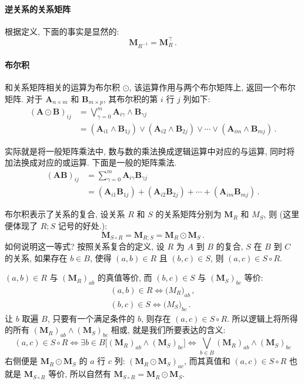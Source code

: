 \documentclass[UTF8]{ctexart}
\theoremstyle{mystyle}
\theoremstyle{myremark}
\theoremstyle{plain}
\newcommand{\ve}[1]{\boldsymbol{\mathbf{#1}}}
\begin{document}
\paragraph{逆关系的关系矩阵}
根据定义, 下面的事实是显然的:
\[ 
    \ve M_{R^{-1}} = \ve M_R^\top \,.
\]

\paragraph{布尔积}
和关系矩阵相关的运算为布尔积 $ \odot $, 该运算作用与两个布尔矩阵上, 返回一个布尔矩阵. 对于 $ \ve A_{n \times m} $ 和 $ \ve B_{m \times p} $, 其布尔积的第 $ i $ 行 $ j $ 列如下:
\begin{align*}
    (\ve A \odot \ve B)_{ij} &= \bigvee_{\gamma = 0}^{m} \ve A_{i \gamma} \land \ve B_{\gamma j} \\
    &= (\ve A_{i1} \land \ve B_{1j}) \lor (\ve A_{i2} \land \ve B_{2j}) \lor \cdots \lor (\ve A_{im} \land \ve B_{mj}) \,.
\end{align*}

实际就是将一般矩阵乘法中, 数与数的乘法换成逻辑运算中对应的与运算, 同时将加法换成对应的或运算. 下面是一般的矩阵乘法.
\begin{align*}
    (\ve A \ve B)_{ij} &= \sum_{\gamma = 0}^{m} \ve A_{i \gamma} \ve B_{\gamma j} \\
    &= (\ve A_{i1} \ve B_{1j}) + (\ve A_{i2} \ve B_{2j}) + \cdots + (\ve A_{im} \ve B_{mj}) \,.
\end{align*}

布尔积表示了关系的复合, 设关系 $ R $ 和 $ S $ 的关系矩阵分别为 $ \ve M_R $ 和 $ M_S $, 则 (这里便体现了 $ R;S $ 记号的好处.):
\[ 
    \ve M_{S \circ R} = \ve M_{R;S} = \ve M_R \odot \ve M_S \,.
\]
如何说明这一等式? 按照关系复合的定义, 设 $ R $ 为 $ A $ 到 $ B $ 的复合, $ S $ 在 $ B $ 到 $ C $ 的关系, 如果存在 $ b \in B $, 使得 $ (a, b) \in R $ 且 $ (b, c) \in S $, 则 $ (a, c) \in S \circ R $.

$ (a, b) \in R $ 与 $ (\ve M_R)_{ab} $ 的真值等价, 而 $ (b, c) \in S $ 与 $ (\ve M_S)_{bc} $ 等价:
\[ \begin{array}{c}
    (a, b) \in R \iff \ve (M_R)_{ab} \,,\\
    (b, c) \in S \iff \ve (M_S)_{bc} \,.
\end{array} \] 
让 $ b $ 取遍 $ B $, 只要有一个满足条件的 $ b $, 则存在 $ (a, c) \in S \circ R $. 所以逻辑上将所得的所有 $ (\ve M_R)_{ab} \land (\ve M_S)_{bc} $ 相或, 就是我们所要表达的含义:
\[ 
    (a, c) \in S \circ R \iff \exists b \in B \bigl[ (\ve M_R)_{ab} \land (\ve M_S)_{bc} \bigr] \iff \bigvee_{b \in B} (\ve M_R)_{ab} \land (\ve M_S)_{bc}
\]
右侧便是 $ \ve M_R \odot \ve M_S $ 的 $ a $ 行 $ c $ 列: $ (\ve M_R \odot \ve M_S)_{ac} $, 而其真值和 $ (a, c) \in S \circ R $ 也就是 $ \ve M_{S \circ R} $ 等价, 所以自然有 $ \ve M_{S \circ R} = \ve M_R \odot \ve M_S $.
\end{document}
